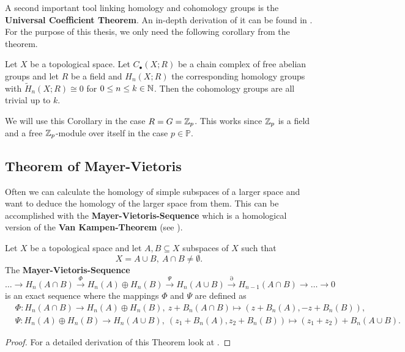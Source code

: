 A second important tool linking homology and cohomology groups is the \textbf{Universal Coefficient Theorem}. An in-depth derivation of it can be found in \cite[Chapter 3.1]{hatcher}. For the purpose of this thesis, we only need the following corollary from the theorem. 

\begin{col}\label{col:hntriv}
  Let $X$ be a topological space. Let $C_\bullet(X; R)$ be a chain complex of free abelian groups and let $R$ be a field and $H_n(X; R)$ the corresponding homology groups with $\tilde{H}_n(X; R) \cong 0$ for $0 \leq n \leq k \in \mathbb{N}$. Then the cohomology groups are all trivial up to $k$. 
\end{col}

We will use this Corollary in the case $R = G = \mathbb{Z}_p$. This works since $\mathbb{Z}_p$ is a field and a free $\mathbb{Z}_p$-module over itself in the case $p \in \mathbb{P}$.

\subsection{Theorem of Mayer-Vietoris}
Often we can calculate the homology of simple subspaces of a larger space and want to deduce the homology of the larger space from them.
This can be accomplished with the \textbf{Mayer-Vietoris-Sequence} which is a homological version of the \textbf{Van Kampen-Theorem} (see \cite[Chapter 1.2]{hatcher}).

\begin{thm}\label{thm:mvs}
  Let $X$ be a topological space and let $A, B \subseteq X$ subspaces of $X$ such that \[X = A \cup B, \: A \cap B \neq \emptyset.\]
  The \textbf{Mayer-Vietoris-Sequence}
  \begin{equation*}
    \ldots \to H_n(A\cap B) \overset{\Phi}{\to} H_n(A) \oplus H_n(B) \overset{\Psi}{\to} H_n(A \cup B) \overset{\partial}{\to} H_{n-1}(A\cap B) \to \ldots \to 0
  \end{equation*}
  is an exact sequence where the mappings $\Phi$ and $\Psi$ are defined as
  \begin{align*}
    &\Phi\colon H_n(A\cap B) \to H_n(A) \oplus H_n(B),\: z + B_n(A\cap B) \mapsto (z+B_n(A), -z + B_n(B)), \\
    &\Psi\colon H_n(A) \oplus H_n(B) \to H_n(A\cup B), \: (z_1+ B_n(A), z_2 + B_n(B)) \mapsto (z_1 + z_2) + B_n(A \cup B).
  \end{align*}
\end{thm}

\begin{proof}
  For a detailed derivation of this Theorem look at \cite[p. 149]{hatcher}. 
\end{proof}


